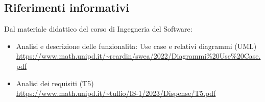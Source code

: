 \subsection{Riferimenti informativi}\label{sec:riferimenti_informativi}
Dal materiale didattico del corso di Ingegneria del Software:
\begin{itemize}
    \item Analisi e descrizione delle funzionalita: Use case e relativi diagrammi (UML) \\
    \url{https://www.math.unipd.it/~rcardin/swea/2022/Diagrammi%20Use%20Case.pdf}
    \item Analisi dei requisiti (T5) \\
    \url{https://www.math.unipd.it/~tullio/IS-1/2023/Dispense/T5.pdf}
\end{itemize}
